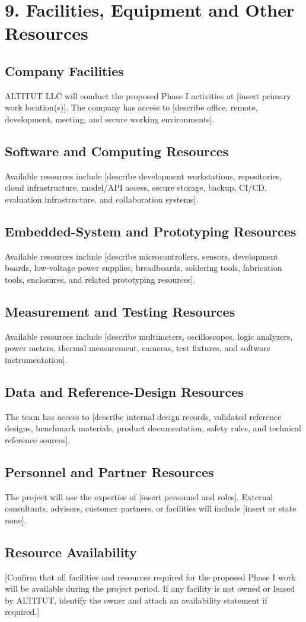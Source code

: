 \documentclass[11pt,letterpaper]{article}
\begin{document}
\section*{9. Facilities, Equipment and Other Resources}


\subsection*{Company Facilities}
ALTITUT LLC will conduct the proposed Phase I activities at [insert primary
work location(s)]. The company has access to [describe office, remote,
development, meeting, and secure working environments].

\subsection*{Software and Computing Resources}
Available resources include [describe development workstations, repositories,
cloud infrastructure, model/API access, secure storage, backup, CI/CD,
evaluation infrastructure, and collaboration systems].

\subsection*{Embedded-System and Prototyping Resources}
Available resources include [describe microcontrollers, sensors, development
boards, low-voltage power supplies, breadboards, soldering tools, fabrication
tools, enclosures, and related prototyping resources].

\subsection*{Measurement and Testing Resources}
Available resources include [describe multimeters, oscilloscopes, logic
analyzers, power meters, thermal measurement, cameras, test fixtures, and
software instrumentation].

\subsection*{Data and Reference-Design Resources}
The team has access to [describe internal design records, validated reference
designs, benchmark materials, product documentation, safety rules, and
technical reference sources].

\subsection*{Personnel and Partner Resources}
The project will use the expertise of [insert personnel and roles]. External
consultants, advisors, customer partners, or facilities will include [insert
or state none].

\subsection*{Resource Availability}
[Confirm that all facilities and resources required for the proposed Phase I
work will be available during the project period. If any facility is not owned
or leased by ALTITUT, identify the owner and attach an availability statement
if required.]
\end{document}
